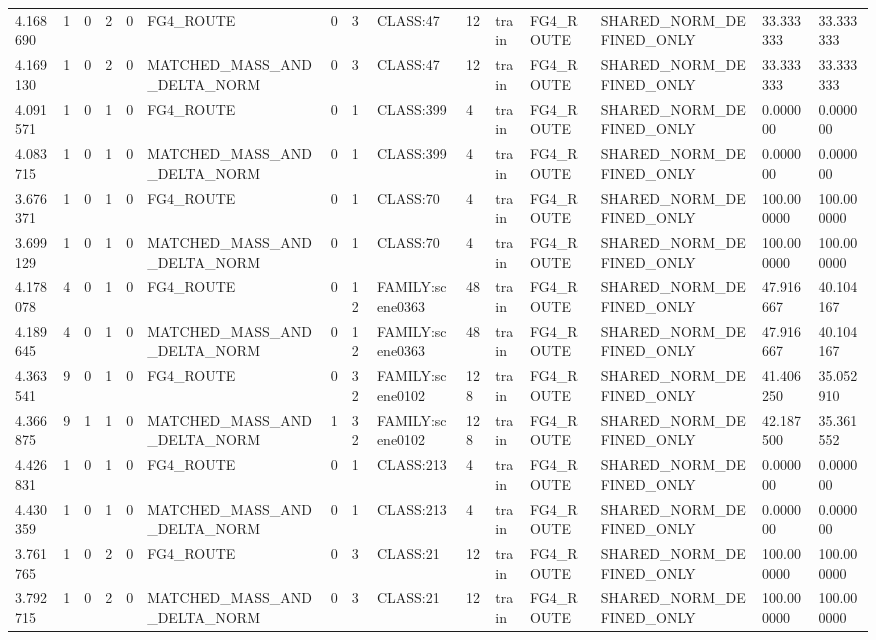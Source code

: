 \begin{tabular}{lllllllllllllll}
4.168690 & 1 & 0 & 2 & 0 & FG4\_ROUTE & 0 & 3 & CLASS:47 & 12 & train & FG4\_ROUTE & SHARED\_NORM\_DEFINED\_ONLY & 33.333333 & 33.333333 \\
4.169130 & 1 & 0 & 2 & 0 & MATCHED\_MASS\_AND\_DELTA\_NORM & 0 & 3 & CLASS:47 & 12 & train & FG4\_ROUTE & SHARED\_NORM\_DEFINED\_ONLY & 33.333333 & 33.333333 \\
4.091571 & 1 & 0 & 1 & 0 & FG4\_ROUTE & 0 & 1 & CLASS:399 & 4 & train & FG4\_ROUTE & SHARED\_NORM\_DEFINED\_ONLY & 0.000000 & 0.000000 \\
4.083715 & 1 & 0 & 1 & 0 & MATCHED\_MASS\_AND\_DELTA\_NORM & 0 & 1 & CLASS:399 & 4 & train & FG4\_ROUTE & SHARED\_NORM\_DEFINED\_ONLY & 0.000000 & 0.000000 \\
3.676371 & 1 & 0 & 1 & 0 & FG4\_ROUTE & 0 & 1 & CLASS:70 & 4 & train & FG4\_ROUTE & SHARED\_NORM\_DEFINED\_ONLY & 100.000000 & 100.000000 \\
3.699129 & 1 & 0 & 1 & 0 & MATCHED\_MASS\_AND\_DELTA\_NORM & 0 & 1 & CLASS:70 & 4 & train & FG4\_ROUTE & SHARED\_NORM\_DEFINED\_ONLY & 100.000000 & 100.000000 \\
4.178078 & 4 & 0 & 1 & 0 & FG4\_ROUTE & 0 & 12 & FAMILY:scene0363 & 48 & train & FG4\_ROUTE & SHARED\_NORM\_DEFINED\_ONLY & 47.916667 & 40.104167 \\
4.189645 & 4 & 0 & 1 & 0 & MATCHED\_MASS\_AND\_DELTA\_NORM & 0 & 12 & FAMILY:scene0363 & 48 & train & FG4\_ROUTE & SHARED\_NORM\_DEFINED\_ONLY & 47.916667 & 40.104167 \\
4.363541 & 9 & 0 & 1 & 0 & FG4\_ROUTE & 0 & 32 & FAMILY:scene0102 & 128 & train & FG4\_ROUTE & SHARED\_NORM\_DEFINED\_ONLY & 41.406250 & 35.052910 \\
4.366875 & 9 & 1 & 1 & 0 & MATCHED\_MASS\_AND\_DELTA\_NORM & 1 & 32 & FAMILY:scene0102 & 128 & train & FG4\_ROUTE & SHARED\_NORM\_DEFINED\_ONLY & 42.187500 & 35.361552 \\
4.426831 & 1 & 0 & 1 & 0 & FG4\_ROUTE & 0 & 1 & CLASS:213 & 4 & train & FG4\_ROUTE & SHARED\_NORM\_DEFINED\_ONLY & 0.000000 & 0.000000 \\
4.430359 & 1 & 0 & 1 & 0 & MATCHED\_MASS\_AND\_DELTA\_NORM & 0 & 1 & CLASS:213 & 4 & train & FG4\_ROUTE & SHARED\_NORM\_DEFINED\_ONLY & 0.000000 & 0.000000 \\
3.761765 & 1 & 0 & 2 & 0 & FG4\_ROUTE & 0 & 3 & CLASS:21 & 12 & train & FG4\_ROUTE & SHARED\_NORM\_DEFINED\_ONLY & 100.000000 & 100.000000 \\
3.792715 & 1 & 0 & 2 & 0 & MATCHED\_MASS\_AND\_DELTA\_NORM & 0 & 3 & CLASS:21 & 12 & train & FG4\_ROUTE & SHARED\_NORM\_DEFINED\_ONLY & 100.000000 & 100.000000 \\

\end{tabular}

